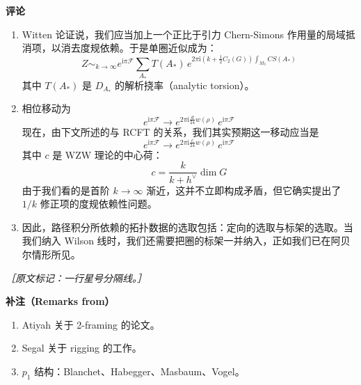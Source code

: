 \textbf{评论}

\begin{enumerate}
  \item Witten 论证说，我们应当加上一个正比于引力 Chern-Simons 作用量的局域抵消项，以消去度规依赖。于是单圈近似成为：
\begin{equation}
  Z\sim_{k\to\infty}e^{\mathrm{i}\pi\mathcal{F}}\sum_{A_{*}}T(A_{*})\,e^{2\pi\mathrm{i}\left(k+\frac{1}{2}C_{2}(G)\right)\int_{M_3}CS(A_{*})}
  \tag{3.33}
  \label{eq:3.33}
\end{equation}
  其中 $T(A_{*})$ 是 $D_{A_{*}}$ 的解析挠率（analytic torsion）。

  \item 相位移动为
\begin{equation}
  e^{\mathrm{i}\pi\mathcal{F}}\to e^{2\pi\mathrm{i}\frac{d}{24}w(\rho)}\,e^{\mathrm{i}\pi\mathcal{F}}
  \tag{3.34}
  \label{eq:3.34}
\end{equation}
  现在，由下文所述的与 RCFT 的关系，我们其实预期这一移动应当是
\begin{equation}
  e^{\mathrm{i}\pi\mathcal{F}}\to e^{2\pi\mathrm{i}\frac{c}{24}w(\rho)}\,e^{\mathrm{i}\pi\mathcal{F}}
  \tag{3.35}
  \label{eq:3.35}
\end{equation}
  其中 $c$ 是 WZW 理论的中心荷：
\begin{equation}
  c=\frac{k}{k+h^{\vee}}\dim G
  \tag{3.36}
  \label{eq:3.36}
\end{equation}
  由于我们看的是首阶 $k\to\infty$ 渐近，这并不立即构成矛盾，但它确实提出了 $1/k$ 修正项的度规依赖性问题。

  \item 因此，路径积分所依赖的拓扑数据的选取包括：定向的选取与标架的选取。当我们纳入 Wilson 线时，我们还需要把圈的标架一并纳入，正如我们已在阿贝尔情形所见。
\end{enumerate}

{\small\itshape ［原文标记：一行星号分隔线。］}

\textbf{补注（Remarks from）}

\begin{enumerate}
  \item Atiyah 关于 2-framing 的论文。

  \item Segal 关于 rigging 的工作。

  \item $p_{1}$ 结构：Blanchet、Habegger、Masbaum、Vogel。
\end{enumerate}


